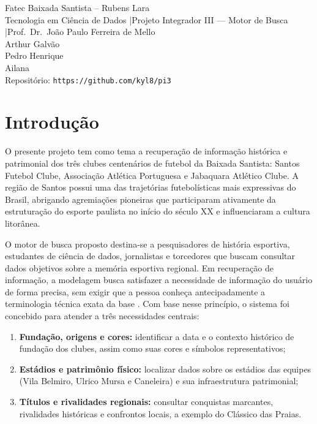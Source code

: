 \documentclass[
  article,
  12pt,
  oneside,
  a4paper,
  english,
  brazil
]{abntex2}\usepackage[]{graphicx}\usepackage[]{xcolor}
\newcommand{\nomecurso}{Tecnologia em Ciência de Dados}
\newcommand{\nomedisciplina}{Projeto Integrador III --- Motor de Busca}
\newcommand{\nomeprofessor}{Prof.\ Dr.\ João Paulo Ferreira de Mello}
\newcommand{\repositorio}{https://github.com/kyl8/pi3}
\newcommand{\integrantes}{%
  Arthur Galvão \\
  Pedro Henrique \\
  Ailana%
}
\begin{document}
\frenchspacing

\maketitle

\begin{center}
  \small
  Fatec Baixada Santista -- Rubens Lara \\
  \nomecurso{} \quad|\quad \nomedisciplina{} \quad|\quad \nomeprofessor{} \\[0.3em]
  \integrantes \\[0.3em]
  Repositório: \texttt{\repositorio}
\end{center}



\textual

\section{Introdução}

O presente projeto tem como tema a recuperação de informação histórica e patrimonial dos três clubes centenários de futebol da Baixada Santista: Santos Futebol Clube, Associação Atlética Portuguesa e Jabaquara Atlético Clube. A região de Santos possui uma das trajetórias futebolísticas mais expressivas do Brasil, abrigando agremiações pioneiras que participaram ativamente da estruturação do esporte paulista no início do século XX e influenciaram a cultura litorânea.

O motor de busca proposto destina-se a pesquisadores de história esportiva, estudantes de ciência de dados, jornalistas e torcedores que buscam consultar dados objetivos sobre a memória esportiva regional. Em recuperação de informação, a modelagem busca satisfazer a necessidade de informação do usuário de forma precisa, sem exigir que a pessoa conheça antecipadamente a terminologia técnica exata da base \cite[cap.~1]{manning2008}. Com base nesse princípio, o sistema foi concebido para atender a três necessidades centrais:
\begin{enumerate}
  \item \textbf{Fundação, origens e cores:} identificar a data e o contexto histórico de fundação dos clubes, assim como suas cores e símbolos representativos;
  \item \textbf{Estádios e patrimônio físico:} localizar dados sobre os estádios das equipes (Vila Belmiro, Ulrico Mursa e Caneleira) e sua infraestrutura patrimonial;
  \item \textbf{Títulos e rivalidades regionais:} consultar conquistas marcantes, rivalidades históricas e confrontos locais, a exemplo do Clássico das Praias.
\end{enumerate}
\end{document}
